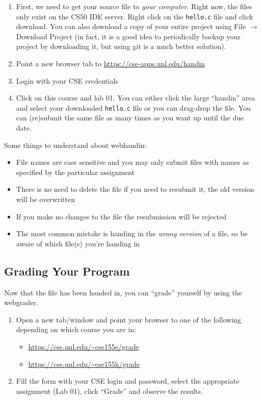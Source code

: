 \documentclass[12pt]{scrartcl}
\begin{document}
\begin{enumerate}
  \item First, we need to get your source file to \emph{your computer}.
  Right now, the files only exist on the CS50 IDE server.  Right click
  on the \texttt{hello.c} file and click download.  You
  can also download a copy of your entire project using File $\rightarrow$
  Download Project (in fact, it is a good idea to periodically backup
  your project by downloading it, but using git is a much better solution).
  \item Point a new browser tab to \url{https://cse-apps.unl.edu/handin}
  \item Login with your CSE credentials
  \item Click on this course and lab 01.  You can either click the 
  large ``handin'' area and select your downloaded \texttt{hello.c} 
  file or you can drag-drop the file.  You can (re)submit the same file as
  many times as you want up until the due date.  
\end{enumerate}

Some things to understand about webhandin:
\begin{itemize}
  \item File names are case sensitive and you may only submit files
  with names as specified by the particular assignment
  \item There is no need to delete the file if you need to resubmit 
  it, the old version will be overwritten
  \item If you make no changes to the file the resubmission will be rejected
  \item The most common mistake is handing in the \emph{wrong version}
  of a file, so be aware of which file(s) you're handing in
\end{itemize}

\subsection{Grading Your Program}

Now that the file has been handed in, you can ``grade'' yourself 
by using the webgrader.

\begin{enumerate}
  \item Open a new tab/window and point your browser to one of 
  the following depending on which course you are in:
  \begin{itemize}
    \item \url{https://cse.unl.edu/~cse155e/grade}
    \item \url{https://cse.unl.edu/~cse155h/grade}
  \end{itemize}
  \item Fill the form with your CSE login and password, select 
  the appropriate assignment (Lab 01), click ``Grade'' and
  observe the results.
\end{enumerate}
\end{document}
